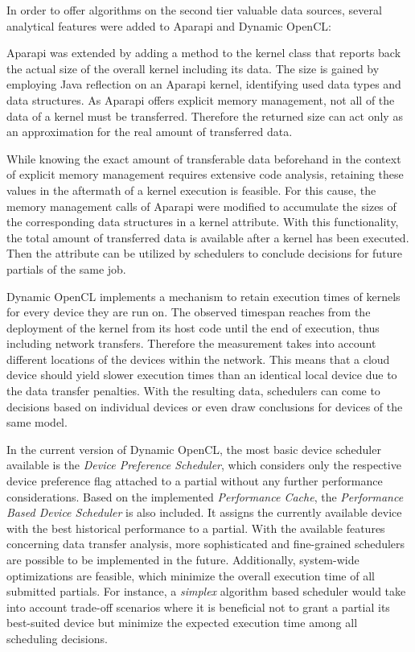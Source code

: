 In order to offer algorithms on the second tier valuable data sources, several analytical features were added to Aparapi and Dynamic OpenCL:
\begin{description}[style=nextline]
	\item[Kernel Data Size]
	Aparapi was extended by adding a method to the kernel class that reports back the actual size of the overall kernel including its data. The size is gained by employing Java reflection on an Aparapi kernel, identifying used data types and data structures. As Aparapi offers explicit memory management, not all of the data of a kernel must be transferred. Therefore the returned size can act only as an approximation for the real amount of transferred data.
	\item[Historical Data Transfer]
	While knowing the exact amount of transferable data beforehand in the context of explicit memory management requires extensive code analysis, retaining these values in the aftermath of a kernel execution is feasible. For this cause, the memory management calls of Aparapi were modified to accumulate the sizes of the corresponding data structures in a kernel attribute. With this functionality, the total amount of transferred data is available after a kernel has been executed. Then the attribute can be utilized by schedulers to conclude decisions for future partials of the same job.
	\item[Performance Cache]
	Dynamic OpenCL implements a mechanism to retain execution times of kernels for every device they are run on. The observed timespan reaches from the deployment of the kernel from its host code until the end of execution, thus including network transfers. Therefore the measurement takes into account different locations of the devices within the network. This means that a cloud device should yield slower execution times than an identical local device due to the data transfer penalties. With the resulting data, schedulers can come to decisions based on individual devices or even draw conclusions for devices of the same model.
\end{description}

In the current version of Dynamic OpenCL, the most basic device scheduler available is the \textit{Device Preference Scheduler}, which considers only the respective device preference flag attached to a partial without any further performance considerations.
Based on the implemented \textit{Performance Cache}, the \textit{Performance Based Device Scheduler} is also included. It assigns the currently available device with the best historical performance to a partial. With the available features concerning data transfer analysis, more sophisticated and fine-grained schedulers are possible to be implemented in the future. Additionally, system-wide optimizations are feasible, which minimize the overall execution time of all submitted partials. For instance, a \textit{simplex} algorithm based scheduler would take into account trade-off scenarios where it is beneficial not to grant a partial its best-suited device but minimize the expected execution time among all scheduling decisions.

